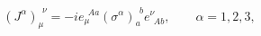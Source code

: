 \begin{equation}
\label{3.2}
(J^\alpha)_\mu^{\!~~\nu} = - i e_\mu^{\!~~A a} (\sigma^\alpha)_a^{\!~~b}
e^\nu_{\!~~A b},
\qquad
\alpha = 1,2,3,
\end{equation}

